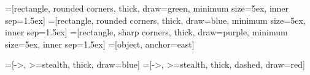 
=[rectangle, rounded corners, thick, draw=green,
  minimum size=5ex, inner sep=1.5ex]
=[rectangle, rounded corners, thick, draw=blue,
  minimum size=5ex, inner sep=1.5ex]
=[rectangle, sharp corners, thick, draw=purple,
  minimum size=5ex, inner sep=1.5ex]
=[object, anchor=east]


=[->, >=stealth, thick, draw=blue]
=[->, >=stealth, thick, dashed, draw=red]
